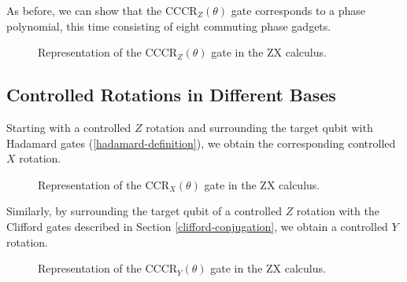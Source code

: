 As before, we can show that the CCCR$_Z(\theta)$ gate corresponds to a phase polynomial, this time consisting of eight commuting phase gadgets.

\begin{figure}[H]
    \centering
    \caption{Representation of the CCCR$_Z(\theta)$ gate in the ZX calculus.}
    \label{cccrz}
\end{figure}

\subsection{Controlled Rotations in Different Bases}

Starting with a controlled $Z$ rotation and surrounding the target qubit with Hadamard gates (\ref{hadamard-definition}), we obtain the corresponding controlled $X$ rotation.

\begin{figure}[H]
    \centering
    \caption{Representation of the CCR$_X(\theta)$ gate in the ZX calculus.}
\end{figure}

Similarly, by surrounding the target qubit of a controlled $Z$ rotation with the Clifford gates described in Section \ref{clifford-conjugation}, we obtain a controlled $Y$ rotation.

\begin{figure}[H]
    \centering
    \caption{Representation of the CCCR$_Y(\theta)$ gate in the ZX calculus.}
    \label{cccry}
\end{figure}
